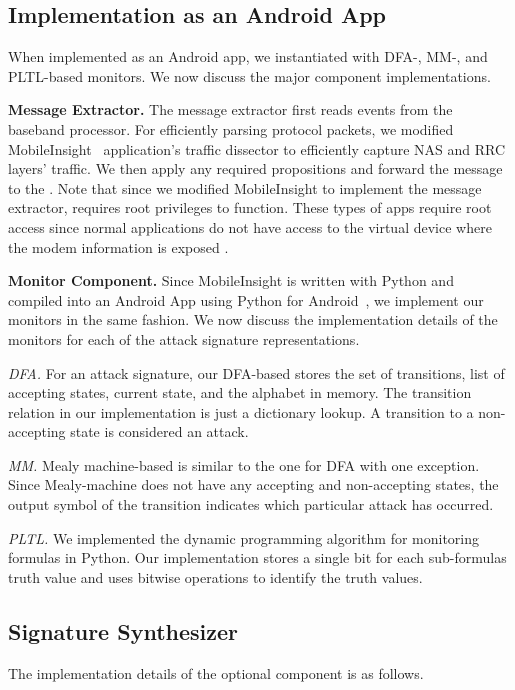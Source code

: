 \subsection{\system Implementation as an Android App}
When implemented as an Android app, we instantiated \system
with DFA-, MM-, and PLTL-based monitors. We now discuss the
major component implementations.

\textbf{Message Extractor.} The message extractor first reads events from the baseband processor.
For efficiently parsing protocol packets, we %
modified MobileInsight~\cite{mobile_insight} application's traffic
dissector to efficiently capture NAS and RRC layers' traffic. We then apply
any required propositions and forward the message to the \monitor.
Note that since we modified MobileInsight to implement the message extractor,
\system requires root privileges to function. These types of apps require root access since normal
applications do not have access to the virtual device where the modem information
is exposed \cite{mobile_insight}.

\textbf{Monitor Component.}
Since MobileInsight is written with Python and compiled into an Android App using Python for Android~\cite{python_for_android},
we implement our monitors in the same fashion.
We now discuss the implementation details of the monitors for each of the attack signature representations.


\textit{DFA.} For an attack signature,
our %
DFA-based \monitor
stores the set of transitions, list of accepting states,
current state, and the alphabet in memory. The transition relation in our
implementation is just a dictionary lookup. A transition to a non-accepting state
is considered an attack.

\textit{MM.} Mealy machine-based \monitor is similar to the one for DFA with one
exception. Since Mealy-machine does not have any accepting and non-accepting states,
the output symbol of the transition indicates which particular attack has occurred.



\textit{PLTL.} We implemented the dynamic programming  algorithm \cite{rosu2001synthesizing} for monitoring \pltl formulas in Python.
Our implementation stores a single bit for each sub-formulas truth value and uses bitwise operations to identify the truth values.



\subsection{Signature Synthesizer} The implementation details of the
optional \signatureSynthesizer component is as follows.


